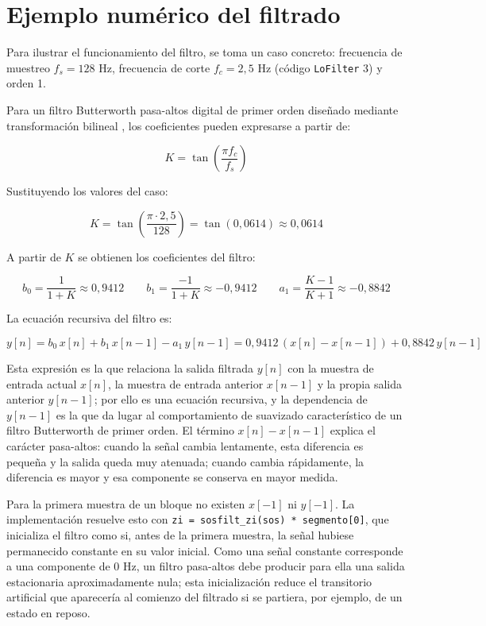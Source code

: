 \documentclass[
  spanish,
  a4paper,
  12pt,
  twoside]{memoir}
\begin{document}
\section{Ejemplo numérico del
filtrado}\label{ejemplo-numuxe9rico-del-filtrado}

Para ilustrar el funcionamiento del filtro, se toma un caso concreto:
frecuencia de muestreo \(f_s = 128\) Hz, frecuencia de corte
\(f_c = 2,5\) Hz (código \texttt{LoFilter} 3) y orden 1.

Para un filtro Butterworth pasa-altos digital de primer orden diseñado
mediante transformación bilineal \citep{OppenheimSchafer2014}, los
coeficientes pueden expresarse a partir de:

\[K = \tan\left(\frac{\pi f_c}{f_s}\right)\]

Sustituyendo los valores del caso:

\[K = \tan\left(\frac{\pi \cdot 2{,}5}{128}\right) = \tan(0{,}0614) \approx 0{,}0614\]

A partir de \(K\) se obtienen los coeficientes del filtro:

\[b_0 = \frac{1}{1+K} \approx 0{,}9412 \qquad b_1 = \frac{-1}{1+K} \approx -0{,}9412 \qquad a_1 = \frac{K-1}{K+1} \approx -0{,}8842\]

La ecuación recursiva del filtro es:

\[y[n] = b_0\,x[n] + b_1\,x[n-1] - a_1\,y[n-1] = 0{,}9412\,(x[n]-x[n-1]) + 0{,}8842\,y[n-1]\]

Esta expresión es la que relaciona la salida filtrada \(y[n]\) con la
muestra de entrada actual \(x[n]\), la muestra de entrada anterior
\(x[n-1]\) y la propia salida anterior \(y[n-1]\); por ello es una
ecuación recursiva, y la dependencia de \(y[n-1]\) es la que da lugar al
comportamiento de suavizado característico de un filtro Butterworth de
primer orden. El término \(x[n]-x[n-1]\) explica el carácter pasa-altos:
cuando la señal cambia lentamente, esta diferencia es pequeña y la
salida queda muy atenuada; cuando cambia rápidamente, la diferencia es
mayor y esa componente se conserva en mayor medida.

Para la primera muestra de un bloque no existen \(x[-1]\) ni \(y[-1]\).
La implementación resuelve esto con
\texttt{zi\ =\ sosfilt\_zi(sos)\ *\ segmento{[}0{]}}, que inicializa el
filtro como si, antes de la primera muestra, la señal hubiese
permanecido constante en su valor inicial. Como una señal constante
corresponde a una componente de 0 Hz, un filtro pasa-altos debe producir
para ella una salida estacionaria aproximadamente nula; esta
inicialización reduce el transitorio artificial que aparecería al
comienzo del filtrado si se partiera, por ejemplo, de un estado en
reposo.
\end{document}
